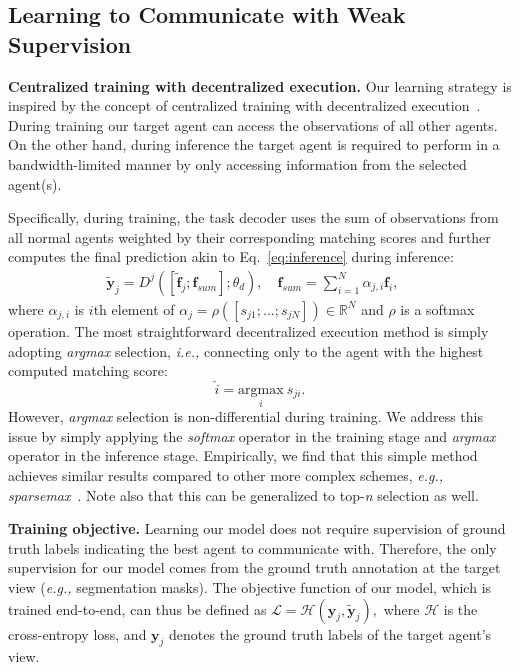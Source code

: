 \subsection{Learning to Communicate with Weak Supervision}
\label{sec: centralized-training}
\textbf{Centralized training with decentralized execution.}
Our learning strategy is inspired by the concept of centralized training with decentralized execution~\cite{lowe2017multi}. During training our target agent can access the observations of all other agents. 
On the other hand, during inference the target agent is required to perform in a bandwidth-limited manner by only accessing information from the selected agent(s). 

Specifically, during training, the task decoder uses the sum of observations from all normal agents weighted by their corresponding matching scores and further computes the final prediction akin to Eq.~\ref{eq:inference} during inference:
\begin{align}\label{eq:softmax}
        \bm{\tilde{y}}_j=D^j([\tilde{\bm{f}}_j; \bm{f}_{sum}];\theta_d), \quad
        \bm{f}_{sum} = \sum_{i=1}^N \alpha_{j,i}\bm{f}_i, \quad
\end{align}
where $\alpha_{j,i}$ is $i$th element of $ \alpha_j = \rho( \left[ s_{j1};...;s_{jN}\right] ) \in\mathbb{R}^{N}$ and $\rho$ is a softmax operation.
The most straightforward decentralized execution method is simply adopting \textit{argmax} selection, \textit{i.e.,} 
connecting only to the agent with the highest computed matching score:
\begin{equation}\label{eq:argmax}
     \hat{i} = \underset{i}{\mathrm{argmax}} \ s_{ji}.
\end{equation}
However, \textit{argmax} selection is non-differential during training. 
We address this issue by simply applying the \textit{softmax} operator in the training stage and \textit{argmax} operator in the inference stage. 
Empirically, we find that this simple method achieves similar results compared to other more complex schemes, \textit{e.g.,} \textit{sparsemax}~\cite{martins2016softmax}.  Note also that this can be generalized to top-\textit{n} selection as well. 

\textbf{Training objective.} Learning our model does not require supervision of ground truth labels indicating the best agent to communicate with.
Therefore, the only supervision for our model comes from the ground truth annotation at the target view (\textit{e.g.,} segmentation masks). The objective function of our model, which is trained end-to-end, can thus be defined as $\mathcal{L} = \mathcal{H}(\bm{y}_j, \bm{\tilde{y}}_j),$
where $\mathcal{H}$ is the cross-entropy loss, and $\bm{y}_j$ denotes the ground truth labels of the target agent's view. 
